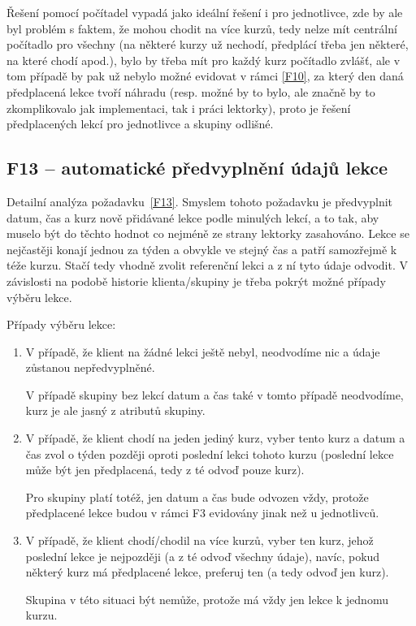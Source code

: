 Řešení pomocí počítadel vypadá jako ideální řešení i pro jednotlivce, zde by ale byl problém s faktem, že mohou chodit na více kurzů, tedy nelze mít centrální počítadlo pro všechny (na některé kurzy už nechodí, předplácí třeba jen některé, na které chodí apod.), bylo by třeba mít pro každý kurz počítadlo zvlášť, ale v tom případě by pak už nebylo možné evidovat v rámci \ref{F10}, za který den daná předplacená lekce tvoří náhradu (resp. možné by to bylo, ale značně by to zkomplikovalo jak implementaci, tak i práci lektorky), proto je řešení předplacených lekcí pro jednotlivce a skupiny odlišné.

\subsection{F13 -- automatické předvyplnění údajů lekce}

Detailní analýza požadavku~\ref{F13}.
Smyslem tohoto požadavku je předvyplnit datum, čas a kurz nově přidávané lekce podle minulých lekcí, a to tak, aby muselo být do těchto hodnot co nejméně ze strany lektorky zasahováno. Lekce se nejčastěji konají jednou za týden a obvykle ve stejný čas a patří samozřejmě k téže kurzu. Stačí tedy vhodně zvolit referenční lekci a z ní tyto údaje odvodit. V závislosti na podobě historie klienta/skupiny je třeba pokrýt možné případy výběru lekce.

Případy výběru lekce:
\begin{enumerate}
    \item V případě, že klient na žádné lekci ještě nebyl, neodvodíme nic a údaje zůstanou nepředvyplněné.
    
    V případě skupiny bez lekcí datum a čas také v tomto případě neodvodíme, kurz je ale jasný z atributů skupiny.
    \item V případě, že klient chodí na jeden jediný kurz, vyber tento kurz a datum a čas zvol o týden později oproti poslední lekci tohoto kurzu (poslední lekce může být jen předplacená, tedy z té odvoď pouze kurz).
    
    Pro skupiny platí totéž, jen datum a čas bude odvozen vždy, protože předplacené lekce budou v rámci F3 evidovány jinak než u jednotlivců.
    \item V případě, že klient chodí/chodil na více kurzů, vyber ten kurz, jehož poslední lekce je nejpozději (a z té odvoď všechny údaje), navíc, pokud některý kurz má předplacené lekce, preferuj ten (a tedy odvoď jen kurz).
    
    Skupina v této situaci být nemůže, protože má vždy jen lekce k jednomu kurzu.
\end{enumerate}

